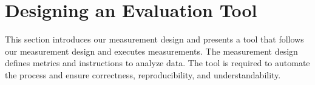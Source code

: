 \section{Designing an Evaluation Tool}
\label{sec:eval_tool:overview_design}
This section introduces our measurement design and presents a tool that follows our measurement design and executes measurements. The measurement design defines metrics and instructions to analyze data. The tool is required to automate the process and ensure correctness, reproducibility, and understandability. 